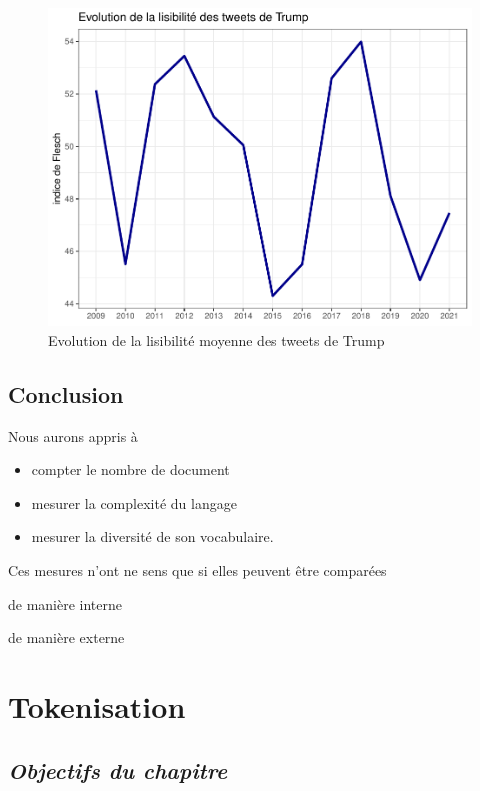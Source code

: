\documentclass[
]{book}
\providecommand{\tightlist}{%
  \setlength{\itemsep}{0pt}\setlength{\parskip}{0pt}}
\begin{document}
\begin{figure}

{\centering \includegraphics[width=0.8\linewidth]{bookdown-demo_files/figure-latex/4-1} 

}

\caption{Evolution de la lisibilité moyenne des tweets de Trump}\label{fig:4}
\end{figure}

\hypertarget{conclusion-2}{%
\section{Conclusion}\label{conclusion-2}}

Nous aurons appris à

\begin{itemize}
\tightlist
\item
  compter le nombre de document
\item
  mesurer la complexité du langage
\item
  mesurer la diversité de son vocabulaire.
\end{itemize}

Ces mesures n'ont ne sens que si elles peuvent être comparées

de manière interne

de manière externe

\hypertarget{token}{%
\chapter{Tokenisation}\label{token}}

\hypertarget{objectifs-du-chapitre}{%
\section{\texorpdfstring{\emph{Objectifs du chapitre}}{Objectifs du chapitre}}\label{objectifs-du-chapitre}}
\end{document}
